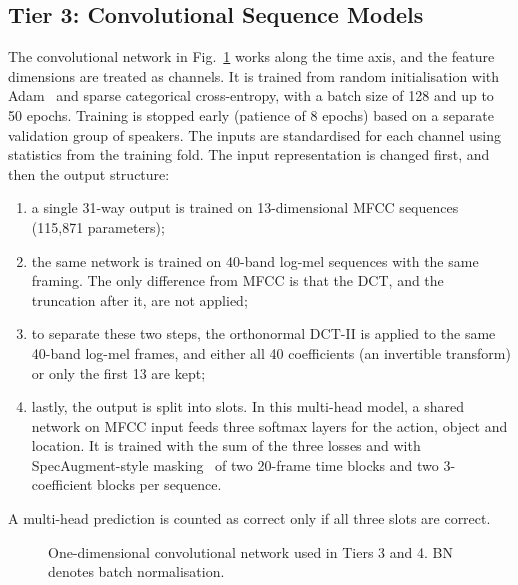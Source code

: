 \documentclass[conference]{IEEEtran}
\begin{document}
\subsection{Tier 3: Convolutional Sequence Models}
The convolutional network in Fig.~\ref{fig:cnn} works along the time axis, and the feature dimensions are treated as channels. It is trained from random initialisation with Adam~\cite{kingma2014adam} and sparse categorical cross-entropy, with a batch size of 128 and up to 50 epochs. Training is stopped early (patience of 8 epochs) based on a separate validation group of speakers. The inputs are standardised for each channel using statistics from the training fold. The input representation is changed first, and then the output structure:
\begin{enumerate}
\item[(i)] a single 31-way output is trained on 13-dimensional MFCC sequences (115,871 parameters);
\item[(ii)] the same network is trained on 40-band log-mel sequences with the same framing. The only difference from MFCC is that the DCT, and the truncation after it, are not applied;
\item[(iii)] to separate these two steps, the orthonormal DCT-II is applied to the same 40-band log-mel frames, and either all 40 coefficients (an invertible transform) or only the first 13 are kept;
\item[(iv)] lastly, the output is split into slots. In this multi-head model, a shared network on MFCC input feeds three softmax layers for the action, object and location. It is trained with the sum of the three losses and with SpecAugment-style masking~\cite{park2019specaugment} of two 20-frame time blocks and two 3-coefficient blocks per sequence.
\end{enumerate}
A multi-head prediction is counted as correct only if all three slots are correct.

\begin{figure}[t]
\centering
\resizebox{0.92\textwidth}{!}{}
\caption{One-dimensional convolutional network used in Tiers 3 and 4. BN denotes batch normalisation.}
\label{fig:cnn}
\end{figure}
\end{document}
